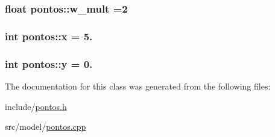 \subsubsection[{\texorpdfstring{w\+\_\+mult}{w_mult}}]{\setlength{\rightskip}{0pt plus 5cm}float pontos\+::w\+\_\+mult =2\hspace{0.3cm}{\ttfamily [private]}}\hypertarget{classpontos_a5809900ae2d67c4f1188e4fa7e1e5d85}{}\label{classpontos_a5809900ae2d67c4f1188e4fa7e1e5d85}
\subsubsection[{\texorpdfstring{x}{x}}]{\setlength{\rightskip}{0pt plus 5cm}int pontos\+::x = 5.\hspace{0.3cm}{\ttfamily [private]}}\hypertarget{classpontos_a8801f4bd9a7391355b70bb23642cc5da}{}\label{classpontos_a8801f4bd9a7391355b70bb23642cc5da}
\subsubsection[{\texorpdfstring{y}{y}}]{\setlength{\rightskip}{0pt plus 5cm}int pontos\+::y = 0.\hspace{0.3cm}{\ttfamily [private]}}\hypertarget{classpontos_ac046437304ec67cf1e820775bb74e52e}{}\label{classpontos_ac046437304ec67cf1e820775bb74e52e}


The documentation for this class was generated from the following files\+:\begin{DoxyCompactItemize}
\item 
include/\hyperlink{pontos_8h}{pontos.\+h}\item 
src/model/\hyperlink{pontos_8cpp}{pontos.\+cpp}\end{DoxyCompactItemize}
